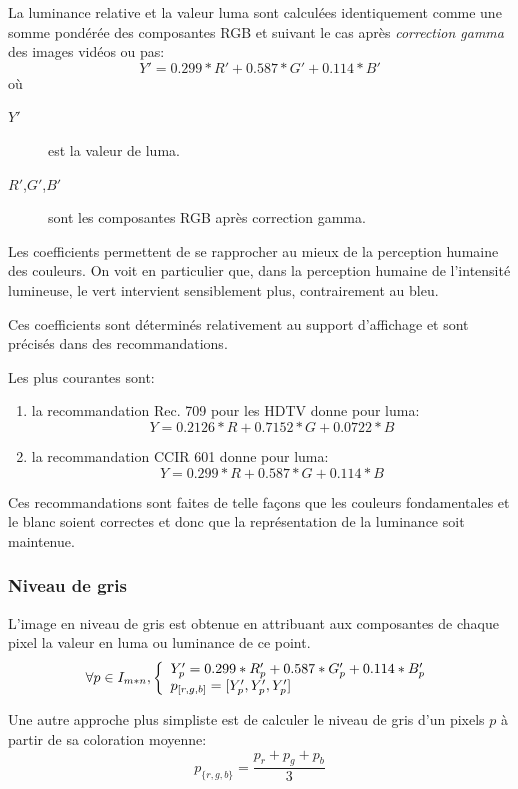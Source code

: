 \documentclass[a4paper,11pt]{report}
\begin{document}
La luminance relative et la valeur luma sont calculées identiquement comme une somme pondérée des composantes RGB et suivant le cas après \textit{correction gamma} des images vidéos ou pas:
$$ Y' = 0.299*R' + 0.587*G' + 0.114*B' $$
où
\begin{description}
\item[$Y'$] est la valeur de luma.
\item[$R'$,$G'$,$B'$] sont les composantes RGB après correction gamma.\\
\end{description}

Les coefficients permettent de se rapprocher au mieux de la perception humaine des couleurs. On voit en particulier que, dans la perception humaine de l'intensité lumineuse, le vert intervient sensiblement plus, contrairement au bleu.

Ces coefficients sont déterminés relativement au support d'affichage et sont précisés dans des recommandations. 

Les plus courantes sont:
\begin{enumerate}
\item la recommandation Rec. 709 pour les HDTV donne pour luma: 
$$Y =  0.2126*R+0.7152*G+0.0722*B $$ 
\item la recommandation CCIR 601 donne pour luma: 
$$Y =  0.299*R+0.587*G+0.114*B $$
\end{enumerate}
Ces recommandations sont faites de telle façons que les couleurs fondamentales et le blanc soient correctes et donc que la représentation de la luminance soit maintenue.\\


\subsubsection*{Niveau de gris}

L'image en niveau de gris est obtenue en attribuant aux composantes de chaque pixel la valeur en luma ou luminance de ce point.
$$
	\forall p \in I_{m*n}, \left\{
	\begin{array}{l l}
	Y'_p = 0.299*R'_p + 0.587*G_p' + 0.114*B'_p \\ 
	p_{[r,g,b]} = [Y'_p,Y'_p,Y'_p] 
	\end{array} \right.
$$


Une autre approche plus simpliste est de calculer le niveau de gris d'un pixels $p$ à partir de sa coloration moyenne: \[p_{\{r,g,b\}} =\frac{p_r+p_g+p_b}{3}\]

\pagebreak
\end{document}
